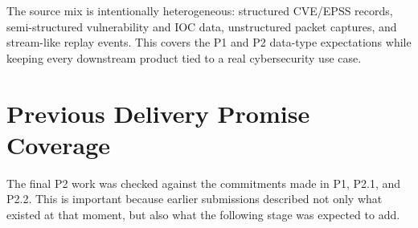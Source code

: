 \documentclass[11pt,a4paper]{article}
\begin{document}
The source mix is intentionally heterogeneous: structured CVE/EPSS records, semi-structured vulnerability and IOC data, unstructured packet captures, and stream-like replay events. This covers the P1 and P2 data-type expectations while keeping every downstream product tied to a real cybersecurity use case.

\section{Previous Delivery Promise Coverage}

The final P2 work was checked against the commitments made in P1, P2.1, and P2.2. This is important because earlier submissions described not only what existed at that moment, but also what the following stage was expected to add.
\end{document}
